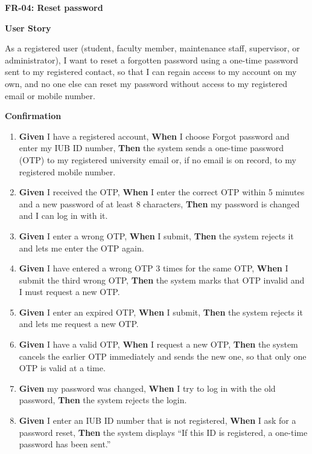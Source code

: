 \noindent\textbf{FR-04: Reset password}\par\nopagebreak[4]\smallskip
\noindent\textbf{User Story}\par\nopagebreak[4]
\noindent As a registered user (student, faculty member, maintenance staff, supervisor, or administrator), I want to reset a forgotten password using a one-time password sent to my registered contact, so that I can regain access to my account on my own, and no one else can reset my password without access to my registered email or mobile number.\par\smallskip
{\makeatletter
{}
\makeatother
\noindent\textbf{Confirmation}\par\nopagebreak[4]\vspace{-6pt}\nopagebreak[4]
\begin{enumerate}\setlength{\itemsep}{2pt}\setlength{\parsep}{0pt}\setlength{\topsep}{2pt}\setlength{\partopsep}{0pt}
  \item \textbf{Given} I have a registered account, \textbf{When} I choose Forgot password and enter my IUB ID number, \textbf{Then} the system sends a one-time password (OTP) to my registered university email or, if no email is on record, to my registered mobile number.
  \item \textbf{Given} I received the OTP, \textbf{When} I enter the correct OTP within 5 minutes and a new password of at least 8 characters, \textbf{Then} my password is changed and I can log in with it.
  \item \textbf{Given} I enter a wrong OTP, \textbf{When} I submit, \textbf{Then} the system rejects it and lets me enter the OTP again.
  \item \textbf{Given} I have entered a wrong OTP 3 times for the same OTP, \textbf{When} I submit the third wrong OTP, \textbf{Then} the system marks that OTP invalid and I must request a new OTP.
  \item \textbf{Given} I enter an expired OTP, \textbf{When} I submit, \textbf{Then} the system rejects it and lets me request a new OTP.
  \item \textbf{Given} I have a valid OTP, \textbf{When} I request a new OTP, \textbf{Then} the system cancels the earlier OTP immediately and sends the new one, so that only one OTP is valid at a time.
  \item \textbf{Given} my password was changed, \textbf{When} I try to log in with the old password, \textbf{Then} the system rejects the login.
  \item \textbf{Given} I enter an IUB ID number that is not registered, \textbf{When} I ask for a password reset, \textbf{Then} the system displays ``If this ID is registered, a one-time password has been sent.''

\end{enumerate}}
